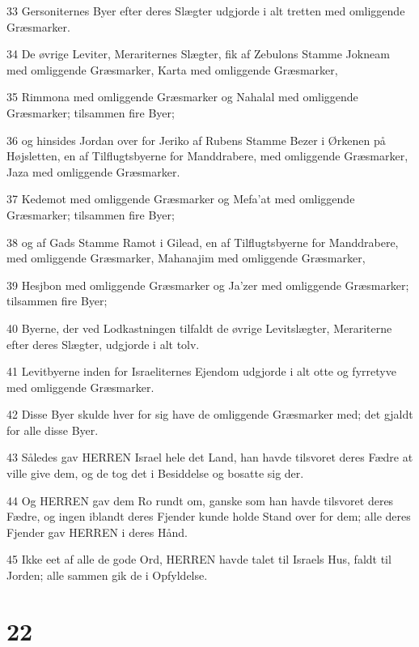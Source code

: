 \par 33 Gersoniternes Byer efter deres Slægter udgjorde i alt tretten med omliggende Græsmarker.
\par 34 De øvrige Leviter, Merariternes Slægter, fik af Zebulons Stamme Jokneam med omliggende Græsmarker, Karta med omliggende Græsmarker,
\par 35 Rimmona med omliggende Græsmarker og Nahalal med omliggende Græsmarker; tilsammen fire Byer;
\par 36 og hinsides Jordan over for Jeriko af Rubens Stamme Bezer i Ørkenen på Højsletten, en af Tilflugtsbyerne for Manddrabere, med omliggende Græsmarker, Jaza med omliggende Græsmarker.
\par 37 Kedemot med omliggende Græsmarker og Mefa'at med omliggende Græsmarker; tilsammen fire Byer;
\par 38 og af Gads Stamme Ramot i Gilead, en af Tilflugtsbyerne for Manddrabere, med omliggende Græsmarker, Mahanajim med omliggende Græsmarker,
\par 39 Hesjbon med omliggende Græsmarker og Ja'zer med omliggende Græsmarker; tilsammen fire Byer;
\par 40 Byerne, der ved Lodkastningen tilfaldt de øvrige Levitslægter, Merariterne efter deres Slægter, udgjorde i alt tolv.
\par 41 Levitbyerne inden for Israeliternes Ejendom udgjorde i alt otte og fyrretyve med omliggende Græsmarker.
\par 42 Disse Byer skulde hver for sig have de omliggende Græsmarker med; det gjaldt for alle disse Byer.
\par 43 Således gav HERREN Israel hele det Land, han havde tilsvoret deres Fædre at ville give dem, og de tog det i Besiddelse og bosatte sig der.
\par 44 Og HERREN gav dem Ro rundt om, ganske som han havde tilsvoret deres Fædre, og ingen iblandt deres Fjender kunde holde Stand over for dem; alle deres Fjender gav HERREN i deres Hånd.
\par 45 Ikke eet af alle de gode Ord, HERREN havde talet til Israels Hus, faldt til Jorden; alle sammen gik de i Opfyldelse.

\chapter{22}

